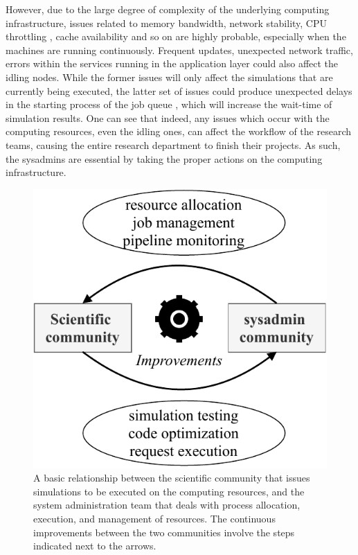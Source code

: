 \documentclass[conference]{IEEEtran}
\begin{document}
\par However, due to the large degree of complexity of the underlying computing infrastructure, issues related to memory bandwidth, network stability, CPU throttling \cite{ibm}, cache availability \cite{awscache} and so on are highly probable, especially when the machines are running continuously. Frequent updates, unexpected network traffic, errors within the services running in the application layer \cite{pstree} could also affect the idling nodes. While the former issues will only affect the simulations that are currently being executed, the latter set of issues could produce unexpected delays in the starting process of the job queue \cite{jobqeue}, which will increase the wait-time of simulation results. One can see that indeed, any issues which occur with the computing resources, even the idling ones, can affect the workflow of the research teams, causing the entire research department to finish their projects. As such, the sysadmins are essential by taking the proper actions on the computing infrastructure.

\begin{figure}[htbp]
\centerline{\includegraphics[scale=0.75]{figs/scientific_sysadmin_optimization.pdf}}
\caption{A basic relationship between the scientific community that issues simulations to be executed on the computing resources, and the system administration team that deals with process allocation, execution, and management of resources. The continuous improvements between the two communities involve the steps indicated next to the arrows.}
\label{community-optimization}
\end{figure}
\end{document}
